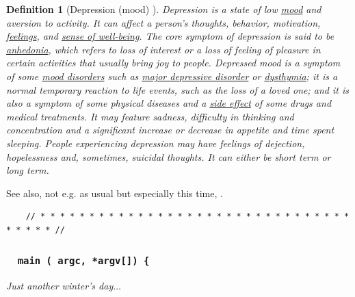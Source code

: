 \documentclass[12pt]{article}
\newtheorem{definition}{Definition}[section]
\begin{document}
\begin{definition}[Depression (mood) \cite{Wikipedia/Depression (mood)}]
	\emph{Depression} is a state of low \href{https://en.wikipedia.org/wiki/Mood_(psychology)}{mood} and aversion to activity. It can affect a person's thoughts, behavior, motivation, \href{https://en.wikipedia.org/wiki/Feeling}{feelings}, and \href{https://en.wikipedia.org/wiki/Subjective_well-being}{sense of well-being}. The core symptom of depression is said to be \href{https://en.wikipedia.org/wiki/Anhedonia}{anhedonia}, which refers to loss of interest or a loss of feeling of pleasure in certain activities that usually bring joy to people. Depressed mood is a symptom of some \href{https://en.wikipedia.org/wiki/Mood_disorders}{mood disorders} such as \href{https://en.wikipedia.org/wiki/Major_depressive_disorder}{major depressive disorder} or \href{https://en.wikipedia.org/wiki/Dysthymia}{dysthymia}; it is a normal temporary reaction to life events, such as the loss of a loved one; and it is also a symptom of some physical diseases and a \href{https://en.wikipedia.org/wiki/Side_effect}{side effect} of some drugs and medical treatments. It may feature sadness, difficulty in thinking and concentration and a significant increase or decrease in appetite and time spent sleeping. People experiencing depression may have feelings of dejection, hopelessness and, sometimes, suicidal thoughts. It can either be short term or long term. 
\end{definition}
See also, not e.g. as usual but especially this time, \cite{Solomon2015}.

\begin{verbatim}
	// * * * * * * * * * * * * * * * * * * * * * * * * * * * * * * * * * * * * * //
\end{verbatim}

\subsubsection{\texttt{{\color{cyan}{\it int}} {\color{YellowGreen} main} ({\color{cyan}{\it int}} argc, {\color{cyan}{\it char}} *argv[]) \{}}

 {\it Just another winter's day}$\ldots$
\end{document}
